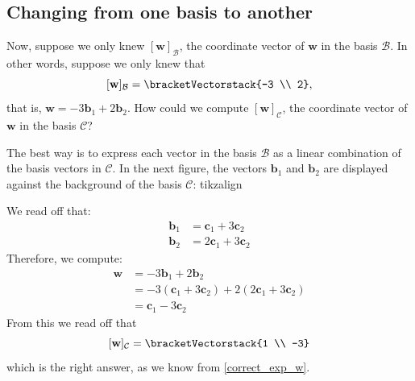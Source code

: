 \documentclass[a4paper,11pt]{book}
\theoremstyle{definition}
\newcommand{\be}{\begin{equation}}
\newcommand{\ee}{\end{equation}}
\newcommand{\ve}[1]{\mathbf{#1}}
\newcommand{\basis}[1]{{\mathcal #1}}
\newcommand{\cvector}[1]{\bracketVectorstack{#1}}
\begin{document}
\subsection{Changing from one basis to another}

Now, suppose we only knew $[\ve{w}]_\basis{B}$, the coordinate vector of $\ve{w}$ in the basis $\basis{B}$. In other words, suppose we only knew that
\[
 [\ve{w}]_\basis{B} = \cvector{-3 \\ 2} , 
\]
that is, $\ve{w} = -3 \ve{b}_1 + 2 \ve{b}_2$. How could we compute $[\ve{w}]_\basis{C}$, the coordinate vector of $\ve{w}$ in the basis $\basis{C}$?

The best way is to express each vector in the basis $\basis{B}$ as a linear combination of the basis vectors in $\basis{C}$. In the next figure, the vectors $\ve{b}_1$ and $\ve{b}_2$ are displayed against the background of the basis $\basis{C}$:
tikzalign
We read off that:
\begin{align} \label{b_in_terms_of_c}
	\ve{b}_1 &= \ve{c}_1 + 3 \ve{c}_2 \\
	\ve{b}_2 &= 2 \ve{c}_1 + 3 \ve{c}_2 \label{b_in_terms_of_c_2} 
\end{align}
Therefore, we compute: 
\begin{align*}
	\ve{w} &= -3 \ve{b}_1 + 2 \ve{b}_2 \\
	&= -3 (\ve{c}_1 + 3 \ve{c}_2) + 2(2 \ve{c}_1 + 3 \ve{c}_2) \\
	&= \ve{c}_1 - 3 \ve{c}_2
\end{align*}
From this we read off that 
\be \label{w_in_basis_C}
  [\ve{w}]_\basis{C} = \cvector{1 \\ -3}
\ee
which is the right answer, as we know from \eqref{correct_exp_w}. 
\end{document}
